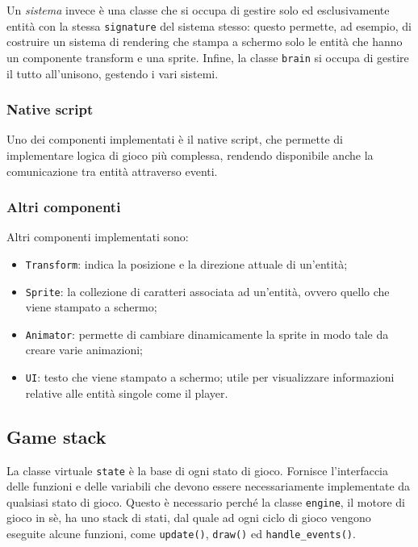 \documentclass{article}
\begin{document}
Un \emph{sistema} invece è una classe che si occupa di gestire solo ed esclusivamente entità con la stessa \verb|signature| del sistema stesso: questo permette, ad esempio, di costruire un sistema di rendering che stampa a schermo solo le entità che hanno un componente transform e una sprite.
Infine, la classe \verb|brain| si occupa di gestire il tutto all'unisono, gestendo i vari sistemi.

\subsubsection{Native script}

Uno dei componenti implementati è il native script, che permette di implementare logica di gioco più complessa, rendendo disponibile anche la comunicazione tra entità attraverso eventi.

\subsubsection{Altri componenti}

Altri componenti implementati sono:
\begin{itemize}
    \item \verb|Transform|: indica la posizione e la direzione attuale di un'entità;
    \item \verb|Sprite|: la collezione di caratteri associata ad un'entità, ovvero quello che viene stampato a schermo;
    \item \verb|Animator|: permette di cambiare dinamicamente la sprite in modo tale da creare varie animazioni;
    \item \verb|UI|: testo che viene stampato a schermo; utile per visualizzare informazioni relative alle entità singole come il player.
\end{itemize}

\subsection{Game stack}

La classe virtuale \verb|state| è la base di ogni stato di gioco. Fornisce l'interfaccia delle funzioni e delle variabili che devono essere necessariamente implementate da qualsiasi stato di gioco. Questo è necessario perché la classe \verb|engine|, il motore di gioco in sè, ha uno stack di stati, dal quale ad ogni ciclo di gioco vengono eseguite alcune funzioni, come \verb|update()|, \verb|draw()| ed \verb|handle_events()|.
\end{document}
